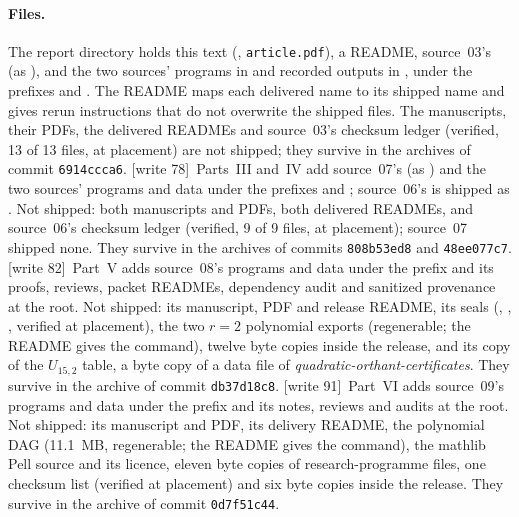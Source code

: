 \documentclass[11pt,letterpaper]{article}
\theoremstyle{definition}
\theoremstyle{remark}
\newcommand{\wtagb}{\textup{[write 78]}}
\newcommand{\wtagc}{\textup{[write 82]}}
\newcommand{\wtagd}{\textup{[write 91]}}
\begin{document}
\paragraph{Files.} The report directory holds this text (, \texttt{article.pdf}), a README, source~03's  (as ), and the two sources' programs in  and recorded outputs in , under the prefixes  and . The README maps each delivered name to its shipped name and gives rerun instructions that do not overwrite the shipped files. The manuscripts, their PDFs, the delivered READMEs and source~03's checksum ledger (verified, 13 of 13 files, at placement) are not shipped; they survive in the archives of commit \texttt{6914ccca6}. \wtagb\ Parts~III and~IV add source~07's  (as ) and the two sources' programs and data under the prefixes  and ; source~06's  is shipped as . Not shipped: both manuscripts and PDFs, both delivered READMEs, and source~06's checksum ledger  (verified, 9 of 9 files, at placement); source~07 shipped none. They survive in the archives of commits \texttt{808b53ed8} and \texttt{48ee077c7}. \wtagc\ Part~V adds source~08's programs and data under the prefix  and its proofs, reviews, packet READMEs, dependency audit and sanitized provenance at the root. Not shipped: its manuscript, PDF and release README, its seals (, , , verified at placement), the two $r=2$ polynomial exports (regenerable; the README gives the command), twelve byte copies inside the release, and its copy of the $U_{15,2}$ table, a byte copy of a data file of \emph{quadratic-orthant-certificates}. They survive in the archive of commit \texttt{db37d18c8}. \wtagd\ Part~VI adds source~09's programs and data under the prefix  and its notes, reviews and audits at the root. Not shipped: its manuscript and PDF, its delivery README, the polynomial DAG (11.1~MB, regenerable; the README gives the command), the mathlib Pell source and its licence, eleven byte copies of research-programme files, one checksum list (verified at placement) and six byte copies inside the release. They survive in the archive of commit \texttt{0d7f51c44}.
\end{document}
